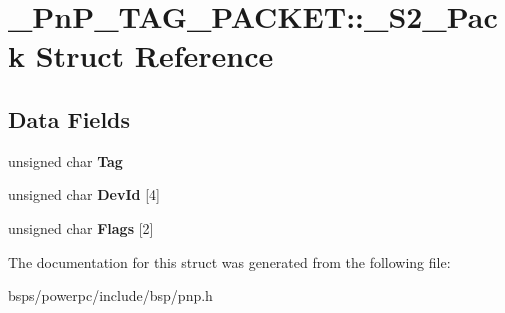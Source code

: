 \hypertarget{struct__PnP__TAG__PACKET_1_1__S2__Pack}{}\section{\+\_\+\+Pn\+P\+\_\+\+T\+A\+G\+\_\+\+P\+A\+C\+K\+ET\+::\+\_\+\+S2\+\_\+\+Pack Struct Reference}
\label{struct__PnP__TAG__PACKET_1_1__S2__Pack}
\subsection*{Data Fields}
\begin{DoxyCompactItemize}
\item 
\mbox{\label{struct__PnP__TAG__PACKET_1_1__S2__Pack_a121c5cbdab21f56e957e58290342861a}} 
unsigned char {\bfseries Tag}
\item 
\mbox{\label{struct__PnP__TAG__PACKET_1_1__S2__Pack_adadfaffb5ec8c221ba770794330fbfe6}} 
unsigned char {\bfseries Dev\+Id} \mbox{[}4\mbox{]}
\item 
\mbox{\label{struct__PnP__TAG__PACKET_1_1__S2__Pack_a342a9e0e512221923313e9f030236b7a}} 
unsigned char {\bfseries Flags} \mbox{[}2\mbox{]}
\end{DoxyCompactItemize}


The documentation for this struct was generated from the following file\+:\begin{DoxyCompactItemize}
\item 
bsps/powerpc/include/bsp/pnp.\+h\end{DoxyCompactItemize}
